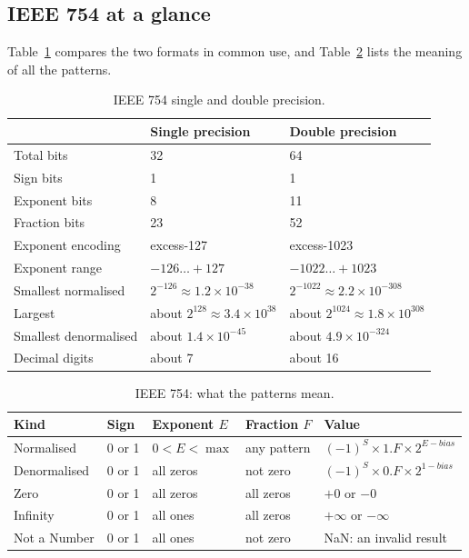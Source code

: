 \subsection{IEEE 754 at a glance}

Table~\ref{tab:real:formats} compares the two formats in common use, and
Table~\ref{tab:real:special} lists the meaning of all the patterns.

\begin{table}[htb]
\centering\small
\caption{IEEE 754 single and double precision.}\label{tab:real:formats}
\begin{tabular}{@{}lll@{}}
\toprule
 & \textbf{Single precision} & \textbf{Double precision}\\
\midrule
Total bits & 32 & 64\\
Sign bits & 1 & 1\\
Exponent bits & 8 & 11\\
Fraction bits & 23 & 52\\
Exponent encoding & excess-127 & excess-1023\\
Exponent range & $-126\ldots+127$ & $-1022\ldots+1023$\\
Smallest normalised & $2^{-126}\approx 1.2\times 10^{-38}$ & $2^{-1022}\approx 2.2\times 10^{-308}$\\
Largest & about $2^{128}\approx 3.4\times 10^{38}$ & about $2^{1024}\approx 1.8\times 10^{308}$\\
Smallest denormalised & about $1.4\times 10^{-45}$ & about $4.9\times 10^{-324}$\\
Decimal digits & about 7 & about 16\\
\bottomrule
\end{tabular}
\end{table}

\begin{table}[htb]
\centering\small
\caption{IEEE 754: what the patterns mean.}\label{tab:real:special}
\begin{tabular}{@{}lllll@{}}
\toprule
\textbf{Kind} & \textbf{Sign} & \textbf{Exponent $E$} & \textbf{Fraction $F$} & \textbf{Value}\\
\midrule
Normalised & 0 or 1 & $0<E<\max$ & any pattern & $(-1)^{S}\times 1.F\times 2^{E-\mathit{bias}}$\\
Denormalised & 0 or 1 & all zeros & not zero & $(-1)^{S}\times 0.F\times 2^{1-\mathit{bias}}$\\
Zero & 0 or 1 & all zeros & all zeros & $+0$ or $-0$\\
Infinity & 0 or 1 & all ones & all zeros & $+\infty$ or $-\infty$\\
Not a Number & 0 or 1 & all ones & not zero & NaN: an invalid result\\
\bottomrule
\end{tabular}
\end{table}

